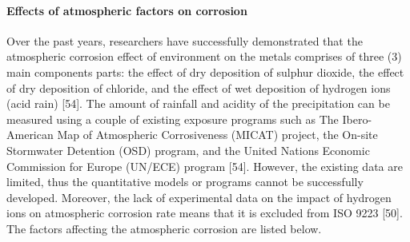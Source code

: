 \documentclass[12pt]{report}
\begin{document}
\paragraph{Effects of atmospheric factors on corrosion} 
Over the past years, researchers have successfully demonstrated that the atmospheric corrosion effect of environment on the metals comprises of three (3) main components parts: the effect of dry deposition of sulphur dioxide, the effect of dry deposition of chloride, and the effect of wet deposition of hydrogen ions (acid rain) [54].
The amount of rainfall and acidity of the precipitation can be measured using a couple of existing exposure programs such as The Ibero-American Map of Atmospheric Corrosiveness (MICAT) project, the On-site Stormwater Detention (OSD) program, and the United Nations Economic Commission for Europe (UN/ECE) program [54]. However, the existing data are limited, thus the quantitative models or programs cannot be successfully developed. Moreover, the lack of experimental data on the impact of hydrogen ions on atmospheric corrosion rate means that it is excluded from ISO 9223 [50]. The factors affecting the atmospheric corrosion are listed below.
\end{document}
